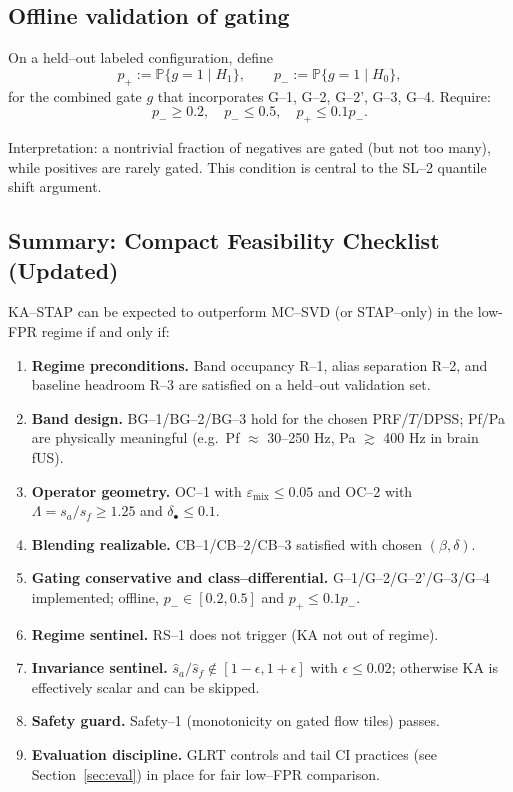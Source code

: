 \documentclass[11pt]{article}
\newcommand{\wh}{\widehat}
\newif\ifSTAPSUPPLEMENTONLY
\begin{document}
\subsection{Offline validation of gating}

On a held--out labeled configuration, define
\[
p_+ := \mathbb{P}\{g=1\mid H_1\},\qquad
p_- := \mathbb{P}\{g=1\mid H_0\},
\]
for the combined gate $g$ that incorporates G--1, G--2, G--2', G--3, G--4. Require:
\[
p_-\ge 0.2,\quad p_- \le 0.5,\quad p_+ \le 0.1 p_-.
\]

Interpretation: a nontrivial fraction of negatives are gated (but not too many), while positives are rarely gated. This condition is central to the SL--2 quantile shift argument.

\subsection{Summary: Compact Feasibility Checklist (Updated)}

KA--STAP can be expected to outperform MC--SVD (or STAP--only) in the low-FPR regime if and only if:

\begin{enumerate}[label=\arabic*.,nosep]
  \item \textbf{Regime preconditions.} Band occupancy R--1, alias separation R--2, and baseline headroom R--3 are satisfied on a held--out validation set.
  \item \textbf{Band design.} BG--1/BG--2/BG--3 hold for the chosen PRF/$T$/DPSS; Pf/Pa are physically meaningful (e.g.\ Pf $\approx$ 30--250 Hz, Pa $\gtrsim$ 400 Hz in brain fUS).
  \item \textbf{Operator geometry.} OC--1 with $\varepsilon_{\text{mix}}\le 0.05$ and OC--2 with $\Lambda = s_a/s_f \ge 1.25$ and $\delta_\bullet\le 0.1$.
  \item \textbf{Blending realizable.} CB--1/CB--2/CB--3 satisfied with chosen $(\beta,\delta)$.
  \item \textbf{Gating conservative and class--differential.} G--1/G--2/G--2'/G--3/G--4 implemented; offline, $p_-\in[0.2,0.5]$ and $p_+\le 0.1p_-$.
  \item \textbf{Regime sentinel.} RS--1 does not trigger (KA not out of regime).
  \item \textbf{Invariance sentinel.} $\wh s_a/\wh s_f \notin[1-\epsilon,1+\epsilon]$ with $\epsilon\le 0.02$; otherwise KA is effectively scalar and can be skipped.
  \item \textbf{Safety guard.} Safety--1 (monotonicity on gated flow tiles) passes.
  \item \textbf{Evaluation discipline.} GLRT controls and tail CI practices (see \ifSTAPSUPPLEMENTONLY the main paper\else Section~\ref{sec:eval}\fi) in place for fair low--FPR comparison.
\end{enumerate}
\end{document}
